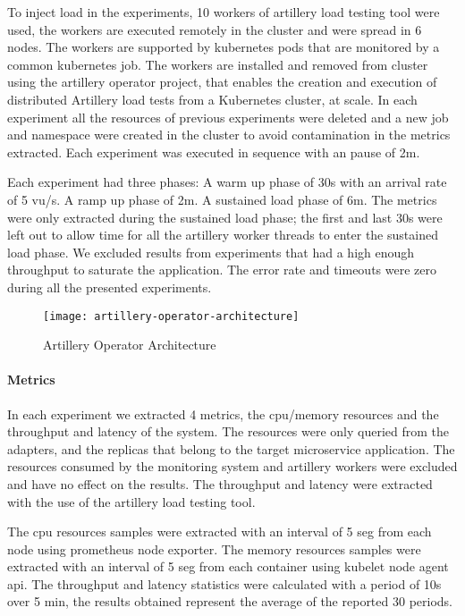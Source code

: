 To inject load in the experiments, 10 workers of artillery load testing tool were used,
the workers are executed remotely in the cluster and were spread in 6 nodes.
The workers are supported by kubernetes pods that are monitored by a common kubernetes job.
The workers are installed and removed from cluster using the artillery operator project, that enables
the creation and execution of distributed Artillery load tests from a Kubernetes cluster, at scale.
In each experiment all the resources of previous experiments were deleted and a new job and namespace were created in the
cluster to avoid contamination in the metrics extracted.
Each experiment was executed in sequence with an pause of 2m.

Each experiment had three phases:
A warm up phase of 30s with an arrival rate of 5 vu/s.
A ramp up phase of 2m.
A sustained load phase of 6m.
The metrics were only extracted during the sustained load phase;
the first and last 30s were left out to allow time for all the artillery worker threads to enter the sustained load phase.
We excluded results from experiments that had a high enough throughput to saturate the application.
The error rate and timeouts were zero during all the presented experiments.

\begin{figure}[htbp]
    \centering
    \texttt{[image: artillery-operator-architecture]}
    \caption{Artillery Operator Architecture}
    \label{fig:gantt}
\end{figure}

\paragraph{Metrics}

In each experiment we extracted 4 metrics, the cpu/memory resources and the throughput and latency of the system.
The resources were only queried from the adapters, and the replicas that belong to the target microservice application.
The resources consumed by the monitoring system and artillery workers were excluded and have no effect
on the results.
The throughput and latency were extracted with the use of the artillery load testing tool.

The cpu resources samples were extracted with an interval of 5 seg from each node using prometheus node exporter.
The memory resources samples were extracted with an interval of 5 seg from each container using kubelet node agent api.
The throughput and latency statistics were calculated with a period of 10s over 5 min, the results obtained represent the
average of the reported 30 periods.